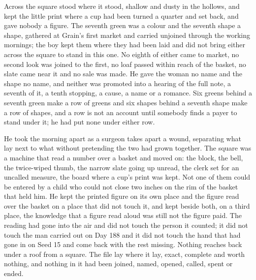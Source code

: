 Across the square  stood where it stood, shallow and dusty in the hollows, and kept the little print where a cup had been turned a quarter and set back, and gave nobody a figure. The seventh green was a colour and the seventh shape a shape, gathered at Grain's first market and carried unjoined through the working mornings; the boy kept them where they had been laid and did not bring either across the square to stand in this one. No eighth of either came to market, no second look was joined to the first, no loaf passed within reach of the basket, no slate came near it and no sale was made. He gave the woman no name and the shape no name, and neither was promoted into a hearing of the full note, a seventh of it, a tenth stopping, a cause, a name or a romance. Six greens behind a seventh green make a row of greens and six shapes behind a seventh shape make a row of shapes, and a row is not an account until somebody finds a payer to stand under it; he had put none under either row.

\scenebreak

He took the morning apart as a surgeon takes apart a wound, separating what lay next to what without pretending the two had grown together. The square was a machine that read a number over a basket and moved on: the block, the bell, the twice-wiped thumb, the narrow slate going up unread, the clerk set for an uncalled measure, the board where a cup's print was kept. Not one of them could be entered by a child who could not close two inches on the rim of the basket that held him. He kept the printed figure on its own place and the figure read over the basket on a place that did not touch it, and kept beside both, on a third place, the knowledge that a figure read aloud was still not the figure paid. The reading had gone into the air and did not touch the person it counted; it did not touch the man carried out on Day 188 and it did not touch the hand that had gone in on Seed 15 and come back with the rest missing. Nothing reaches back under a roof from a square. The file lay where it lay, exact, complete and worth nothing, and nothing in it had been joined, named, opened, called, spent or ended.

